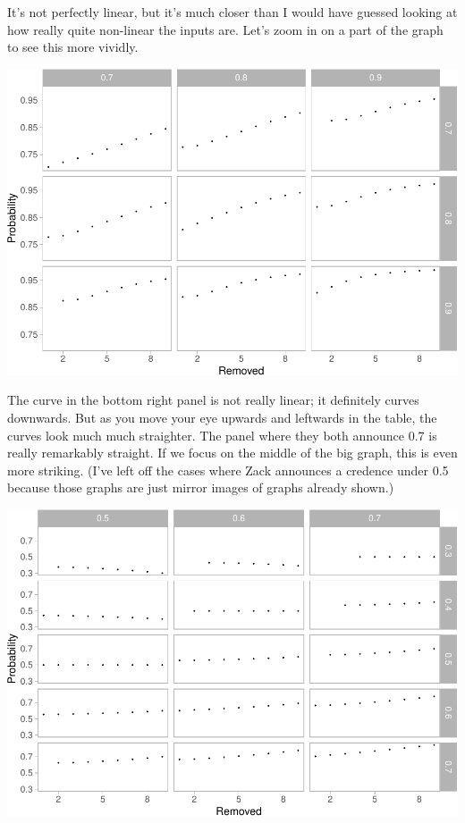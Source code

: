 \documentclass[
  12pt,
]{article}
\begin{document}
It's not perfectly linear, but it's much closer than I would have
guessed looking at how really quite non-linear the inputs are. Let's
zoom in on a part of the graph to see this more vividly.

\includegraphics{mixing-experts_files/figure-latex/unnamed-chunk-3-1.pdf}

The curve in the bottom right panel is not really linear; it definitely
curves downwards. But as you move your eye upwards and leftwards in the
table, the curves look much much straighter. The panel where they both
announce 0.7 is really remarkably straight. If we focus on the middle of
the big graph, this is even more striking. (I've left off the cases
where Zack announces a credence under 0.5 because those graphs are just
mirror images of graphs already shown.)

\includegraphics{mixing-experts_files/figure-latex/unnamed-chunk-4-1.pdf}
\end{document}
